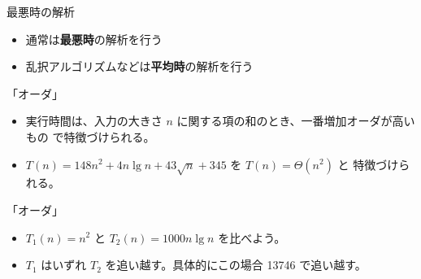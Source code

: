 \documentclass[unicode,11pt,aspectratio=169,notes]{beamer} %
\begin{document}
\begin{frame}{最悪時の解析}
  \begin{itemize}
    \item 通常は\textbf{最悪時}の解析を行う
    \item 乱択アルゴリズムなどは\textbf{平均時}の解析を行う
  \end{itemize}
\end{frame}


\begin{frame}{「オーダ」}
  \begin{itemize}
    \item 実行時間は、入力の大きさ $n$ に関する項の和のとき、一番増加オーダが高いもの
    で特徴づけられる。
    \item $T(n) = 148n^2 + 4n\lg n + 43\sqrt{n} + 345$ を $T(n) = \Theta(n^2)$ と
    特徴づけられる。
  \end{itemize}
\end{frame}


\begin{frame}{「オーダ」}
  \begin{itemize}
    \item<1-> $T_1(n) = n^2$ と $T_2(n) = 1000n\lg n$ を比べよう。
    \item<2-> $T_1$ はいずれ $T_2$ を追い越す。具体的にこの場合 13746 で追い越す。
  \end{itemize}
\end{frame}

\end{document}
